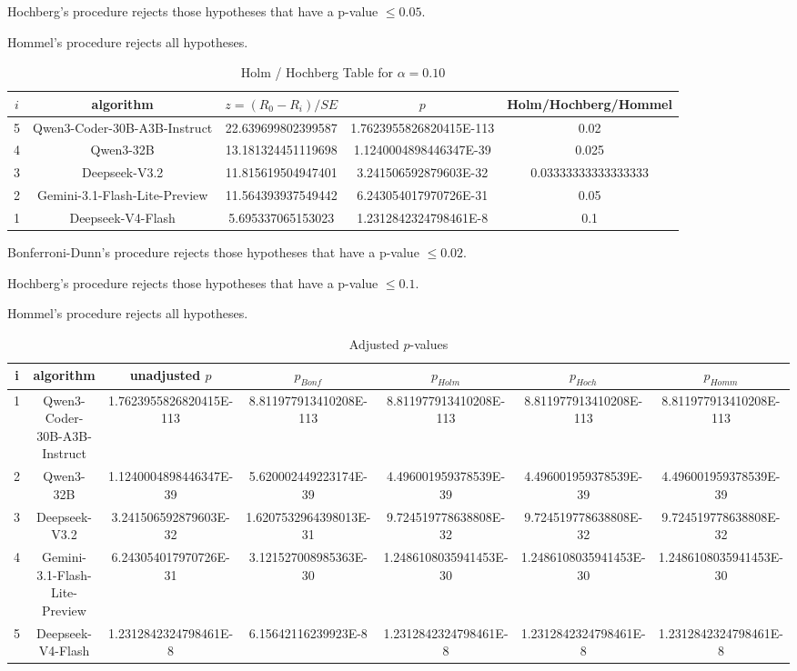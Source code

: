 \documentclass[a4paper,10pt]{article}
\begin{document}
\begin{landscape}
Hochberg's procedure rejects those hypotheses that have a p-value $\le0.05$.


Hommel's procedure rejects all hypotheses.


\begin{table}[!htp]
\centering\tiny
\caption{Holm / Hochberg Table for $\alpha=0.10$}
\begin{tabular}{ccccc}
$i$&algorithm&$z=(R_0 - R_i)/SE$&$p$&Holm/Hochberg/Hommel\\
\hline
5&Qwen3-Coder-30B-A3B-Instruct&22.639699802399587&1.7623955826820415E-113&0.02\\
4&Qwen3-32B&13.181324451119698&1.1240004898446347E-39&0.025\\
3&Deepseek-V3.2&11.815619504947401&3.241506592879603E-32&0.03333333333333333\\
2&Gemini-3.1-Flash-Lite-Preview&11.564393937549442&6.243054017970726E-31&0.05\\
1&Deepseek-V4-Flash&5.695337065153023&1.2312842324798461E-8&0.1\\
\hline
\end{tabular}
\end{table}
Bonferroni-Dunn's procedure rejects those hypotheses that have a p-value $\le0.02$.


Hochberg's procedure rejects those hypotheses that have a p-value $\le0.1$.


Hommel's procedure rejects all hypotheses.


\begin{table}[!htp]
\centering\tiny
\caption{Adjusted $p$-values}
\begin{tabular}{ccccccc}
i&algorithm&unadjusted $p$&$p_{Bonf}$&$p_{Holm}$&$p_{Hoch}$&$p_{Homm}$\\
\hline
1&Qwen3-Coder-30B-A3B-Instruct&1.7623955826820415E-113&8.811977913410208E-113&8.811977913410208E-113&8.811977913410208E-113&8.811977913410208E-113\\
2&Qwen3-32B&1.1240004898446347E-39&5.620002449223174E-39&4.496001959378539E-39&4.496001959378539E-39&4.496001959378539E-39\\
3&Deepseek-V3.2&3.241506592879603E-32&1.6207532964398013E-31&9.724519778638808E-32&9.724519778638808E-32&9.724519778638808E-32\\
4&Gemini-3.1-Flash-Lite-Preview&6.243054017970726E-31&3.121527008985363E-30&1.2486108035941453E-30&1.2486108035941453E-30&1.2486108035941453E-30\\
5&Deepseek-V4-Flash&1.2312842324798461E-8&6.15642116239923E-8&1.2312842324798461E-8&1.2312842324798461E-8&1.2312842324798461E-8\\
\hline
\end{tabular}
\end{table}


\end{landscape}
\end{document}
